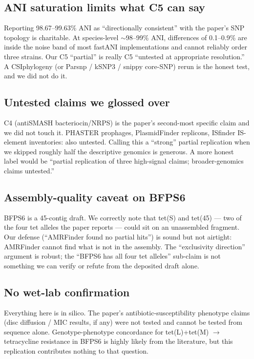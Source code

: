 \documentclass[11pt]{article}
\begin{document}
\subsection{ANI saturation limits what C5 can say}
Reporting 98.67--99.63\% ANI as ``directionally consistent'' with the paper's SNP topology is charitable. At species-level $\sim$98--99\% ANI, differences of 0.1--0.9\% are inside the noise band of most fastANI implementations and cannot reliably order three strains. Our C5 ``partial'' is really C5 ``untested at appropriate resolution.'' A CSIphylogeny (or Parsnp / kSNP3 / snippy core-SNP) rerun is the honest test, and we did not do it.

\subsection{Untested claims we glossed over}
C4 (antiSMASH bacteriocin/NRPS) is the paper's second-most specific claim and we did not touch it. PHASTER prophages, PlasmidFinder replicons, ISfinder IS-element inventories: also untested. Calling this a ``strong'' partial replication when we skipped roughly half the descriptive genomics is generous. A more honest label would be ``partial replication of three high-signal claims; broader-genomics claims untested.''

\subsection{Assembly-quality caveat on BFPS6}
BFPS6 is a 45-contig draft. We correctly note that tet(S) and tet(45) --- two of the four tet alleles the paper reports --- could sit on an unassembled fragment. Our defense (``AMRFinder found no partial hits'') is sound but not airtight: AMRFinder cannot find what is not in the assembly. The ``exclusivity direction'' argument is robust; the ``BFPS6 has all four tet alleles'' sub-claim is not something we can verify or refute from the deposited draft alone.

\subsection{No wet-lab confirmation}
Everything here is in silico. The paper's antibiotic-susceptibility phenotype claims (disc diffusion / MIC results, if any) were not tested and cannot be tested from sequence alone. Genotype-phenotype concordance for tet(L)+tet(M) $\rightarrow$ tetracycline resistance in BFPS6 is highly likely from the literature, but this replication contributes nothing to that question.
\end{document}
